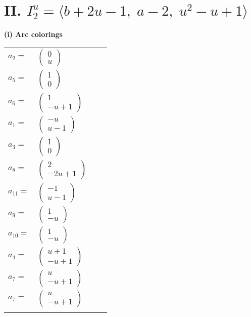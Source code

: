 \documentclass[1p]{elsarticle_modified}
\theoremstyle{definition}
\begin{document}
\centering \section*{II. $I^u_{2}= \langle b+2 u-1,\;a-2,\;u^2- u+1 \rangle$}
\flushleft \textbf{(i) Arc colorings}\\
\begin{tabular}{m{7pt} m{180pt} m{7pt} m{180pt} }
\flushright $a_{2}=$&$\begin{pmatrix}0\\u\end{pmatrix}$ \\
\flushright $a_{5}=$&$\begin{pmatrix}1\\0\end{pmatrix}$ \\
\flushright $a_{6}=$&$\begin{pmatrix}1\\- u+1\end{pmatrix}$ \\
\flushright $a_{1}=$&$\begin{pmatrix}- u\\u-1\end{pmatrix}$ \\
\flushright $a_{3}=$&$\begin{pmatrix}1\\0\end{pmatrix}$ \\
\flushright $a_{8}=$&$\begin{pmatrix}2\\-2 u+1\end{pmatrix}$ \\
\flushright $a_{11}=$&$\begin{pmatrix}-1\\u-1\end{pmatrix}$ \\
\flushright $a_{9}=$&$\begin{pmatrix}1\\- u\end{pmatrix}$ \\
\flushright $a_{10}=$&$\begin{pmatrix}1\\- u\end{pmatrix}$ \\
\flushright $a_{4}=$&$\begin{pmatrix}u+1\\- u+1\end{pmatrix}$ \\
\flushright $a_{7}=$&$\begin{pmatrix}u\\- u+1\end{pmatrix}$\\ \flushright $a_{7}=$&$\begin{pmatrix}u\\- u+1\end{pmatrix}$\\&\end{tabular}
\end{document}

